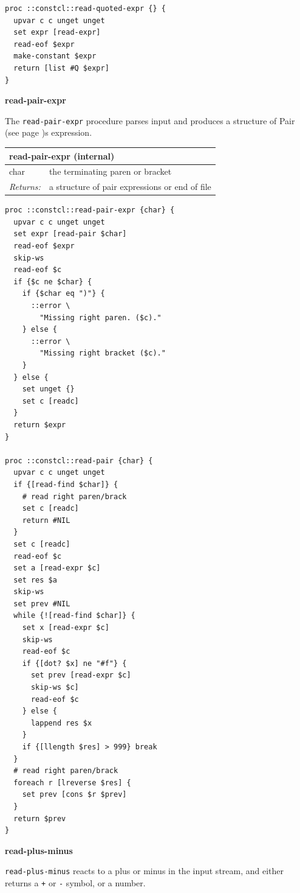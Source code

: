 \documentclass[twoside,9pt]{report}
\begin{document}
\noindent\makebox[\linewidth]{\rule{\linewidth}{0.4pt}}
\begin{lstlisting}
proc ::constcl::read-quoted-expr {} {
  upvar c c unget unget
  set expr [read-expr]
  read-eof $expr
  make-constant $expr
  return [list #Q $expr]
}
\end{lstlisting}
\noindent\makebox[\linewidth]{\rule{\linewidth}{0.4pt}}

\textbf{read-pair-expr}


The \texttt{read-pair-expr} procedure parses input and produces a structure of Pair (see page \pageref{pairs-and-lists})s expression.

\begin{tabular}{ |l l| }
\hline
\multicolumn{2}{|l|}{read-pair-expr (internal)} \\
\hline
char & the terminating paren or bracket \\
\textit{Returns:} & a structure of pair expressions or end of file \\
\hline
\end{tabular}

\noindent\makebox[\linewidth]{\rule{\linewidth}{0.4pt}}
\begin{lstlisting}
proc ::constcl::read-pair-expr {char} {
  upvar c c unget unget
  set expr [read-pair $char]
  read-eof $expr
  skip-ws
  read-eof $c
  if {$c ne $char} {
    if {$char eq ")"} {
      ::error \
        "Missing right paren. ($c)."
    } else {
      ::error \
        "Missing right bracket ($c)."
    }
  } else {
    set unget {}
    set c [readc]
  }
  return $expr
}
 
proc ::constcl::read-pair {char} {
  upvar c c unget unget
  if {[read-find $char]} {
    # read right paren/brack
    set c [readc]
    return #NIL
  }
  set c [readc]
  read-eof $c
  set a [read-expr $c]
  set res $a
  skip-ws
  set prev #NIL
  while {![read-find $char]} {
    set x [read-expr $c]
    skip-ws
    read-eof $c
    if {[dot? $x] ne "#f"} {
      set prev [read-expr $c]
      skip-ws $c]
      read-eof $c
    } else {
      lappend res $x
    }
    if {[llength $res] > 999} break
  }
  # read right paren/brack
  foreach r [lreverse $res] {
    set prev [cons $r $prev]
  }
  return $prev
}
\end{lstlisting}
\noindent\makebox[\linewidth]{\rule{\linewidth}{0.4pt}}

\textbf{read-plus-minus}


\texttt{read-plus-minus} reacts to a plus or minus in the input stream, and either returns a \texttt{+} or \texttt{-} symbol, or a number.
\end{document}
